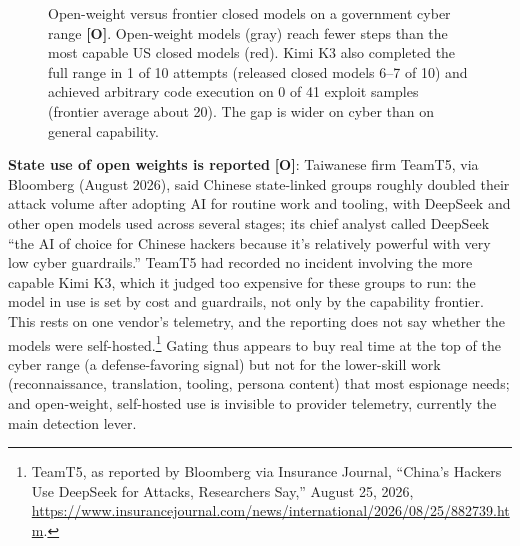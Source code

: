 \documentclass[11pt,letterpaper]{article}
\begin{document}
\begin{figure}[htbp]
\centering
{}
\caption{Open-weight versus frontier closed models on a government cyber range \textbf{[O]}. Open-weight models (gray) reach fewer steps than the most capable US closed models (red). Kimi K3 also completed the full range in 1 of 10 attempts (released closed models 6--7 of 10) and achieved arbitrary code execution on 0 of 41 exploit samples (frontier average about 20). The gap is wider on cyber than on general capability.}
\label{fig:openweight}
\end{figure}

\textbf{State use of open weights is reported} \textbf{[O]}: Taiwanese firm TeamT5, via Bloomberg (August 2026), said Chinese state-linked groups roughly doubled their attack volume after adopting AI for routine work and tooling, with DeepSeek and other open models used across several stages; its chief analyst called DeepSeek ``the AI of choice for Chinese hackers because it's relatively powerful with very low cyber guardrails.'' TeamT5 had recorded no incident involving the more capable Kimi K3, which it judged too expensive for these groups to run: the model in use is set by cost and guardrails, not only by the capability frontier. This rests on one vendor's telemetry, and the reporting does not say whether the models were self-hosted.\footnote{TeamT5, as reported by Bloomberg via Insurance Journal, ``China's Hackers Use DeepSeek for Attacks, Researchers Say,'' August 25, 2026, \url{https://www.insurancejournal.com/news/international/2026/08/25/882739.htm}.} Gating thus appears to buy real time at the top of the cyber range (a defense-favoring signal) but not for the lower-skill work (reconnaissance, translation, tooling, persona content) that most espionage needs; and open-weight, self-hosted use is invisible to provider telemetry, currently the main detection lever.
\end{document}
